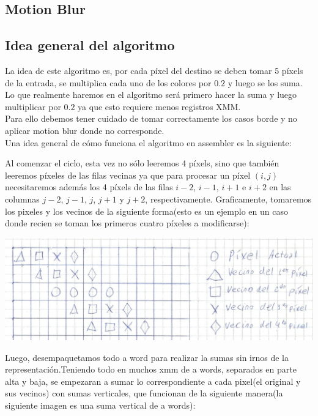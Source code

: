 \documentclass[a4paper]{article}
\begin{document}
\newpage
\subsection{Motion Blur}
\subsection{Idea general del algoritmo}
La idea de este algoritmo es, por cada píxel del destino se deben tomar 5 píxels de la entrada, se multiplica cada uno de los colores por $0.2$ y luego se los suma. Lo que realmente haremos en el algoritmo será primero hacer la suma y luego multiplicar por $0.2$ ya que esto requiere menos registros XMM.
\\
Para ello debemos tener cuidado de tomar correctamente los casos borde y no aplicar motion blur donde no corresponde.
\\
Una idea general de cómo funciona el algoritmo en assembler es la siguiente:

Al comenzar el ciclo, esta vez no sólo leeremos 4 píxels, sino que también leeremos píxeles de las filas vecinas ya que para procesar un píxel $(i,j)$ necesitaremos además los 4 píxels de las filas $i-2$, $i-1$, $i+1$ e $i+2$ en las columnas $j-2$, $j-1$, $j$, $j+1$ y $j+2$, respectivamente. Graficamente, tomaremos los pixeles y los vecinos de la siguiente forma(esto es un ejemplo en un caso donde recien se toman los primeros cuatro píxeles a modificarse):

\begin{center}
\includegraphics[scale=0.66]{Dibujos/MB1.jpg}
\end{center}

Luego, desempaquetamos todo a word para realizar la sumas sin irnos de la representación.Teniendo todo en muchos xmm de a words, separados en parte alta y baja, se empezaran a sumar lo correspondiente a cada pixel(el original y sus vecinos) con sumas verticales, que funcionan de la siguiente manera(la siguiente imagen es una suma vertical de a words):
\end{document}
